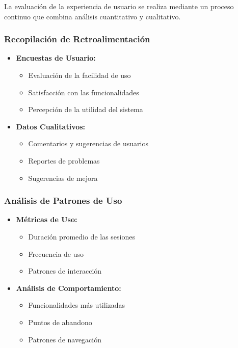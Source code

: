 La evaluación de la experiencia de usuario se realiza mediante un proceso continuo que combina análisis cuantitativo y cualitativo.

\subsubsection{Recopilación de Retroalimentación}

\begin{itemize}
    \item \textbf{Encuestas de Usuario:}
    \begin{itemize}
        \item Evaluación de la facilidad de uso
        \item Satisfacción con las funcionalidades
        \item Percepción de la utilidad del sistema
    \end{itemize}

    \item \textbf{Datos Cualitativos:}
    \begin{itemize}
        \item Comentarios y sugerencias de usuarios
        \item Reportes de problemas
        \item Sugerencias de mejora
    \end{itemize}
\end{itemize}

\subsubsection{Análisis de Patrones de Uso}

\begin{itemize}
    \item \textbf{Métricas de Uso:}
    \begin{itemize}
        \item Duración promedio de las sesiones
        \item Frecuencia de uso
        \item Patrones de interacción
    \end{itemize}

    \item \textbf{Análisis de Comportamiento:}
    \begin{itemize}
        \item Funcionalidades más utilizadas
        \item Puntos de abandono
        \item Patrones de navegación
    \end{itemize}
\end{itemize}

